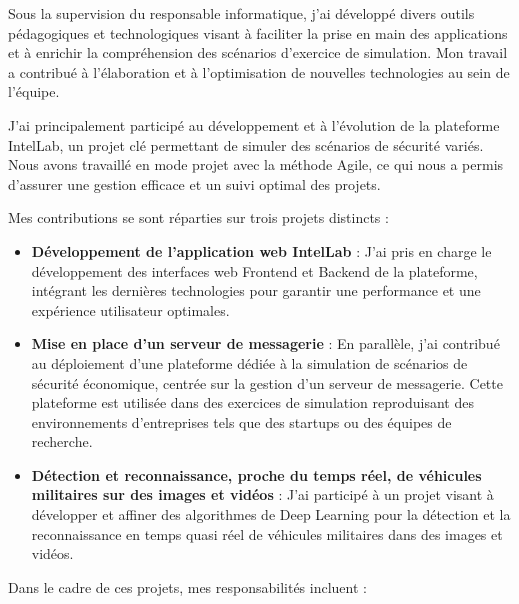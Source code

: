 Sous la supervision du responsable informatique, j'ai développé divers outils pédagogiques et technologiques visant à faciliter la prise en main des applications et à enrichir la compréhension des scénarios d'exercice de simulation. Mon travail a contribué à l'élaboration et à l'optimisation de nouvelles technologies au sein de l'équipe.

J'ai principalement participé au développement et à l'évolution de la plateforme IntelLab, un projet clé permettant de simuler des scénarios de sécurité variés.
Nous avons travaillé en mode projet avec la méthode Agile, ce qui nous a permis d'assurer une gestion efficace et un suivi optimal des projets.

\noindent Mes contributions se sont réparties sur trois projets distincts :

\begin{itemize}\addtolength{\itemsep}{-0.35\baselineskip}%
  \item \textbf{Développement de l'application web IntelLab }: J'ai pris en charge le développement des interfaces web Frontend et Backend de la plateforme, intégrant les dernières technologies pour garantir une performance et une expérience utilisateur optimales.
  \item \textbf{Mise en place d'un serveur de messagerie} : En parallèle, j'ai contribué au déploiement d'une plateforme dédiée à la simulation de scénarios de sécurité économique, centrée sur la gestion d'un serveur de messagerie. Cette plateforme est utilisée dans des exercices de simulation reproduisant des environnements d'entreprises tels que des startups ou des équipes de recherche.
  \item \textbf{Détection et reconnaissance, proche du temps réel, de véhicules militaires sur des images et vidéos} : J'ai participé à un projet visant à développer et affiner des algorithmes de Deep Learning pour la détection et la reconnaissance en temps quasi réel de véhicules militaires dans des images et vidéos.
\end{itemize}

\noindent Dans le cadre de ces projets, mes responsabilités incluent :


